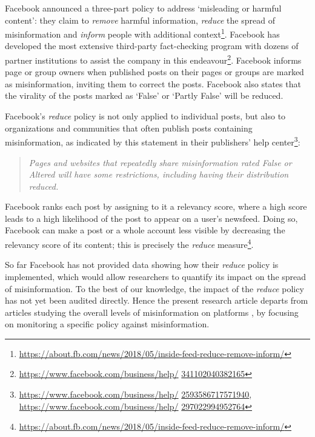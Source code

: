 \documentclass[11pt,a4paper]{article}
\begin{document}
Facebook announced a three-part policy to address ‘misleading or harmful content’: they claim to \textit{remove} harmful information, \textit{reduce} the spread of misinformation and \textit{inform} people with additional context\footnote{\href{https://about.fb.com/news/2018/05/inside-feed-reduce-remove-inform/}{https://about.fb.com/news/2018/05/inside-feed-reduce-remove-inform/}}. 
Facebook has developed the most extensive third-party fact-checking program with dozens of partner institutions to assist the company in this endeavour\footnote{\href{https://www.facebook.com/business/help/341102040382165}{https://www.facebook.com/business/help/} \href{https://www.facebook.com/business/help/341102040382165}{341102040382165}}.
Facebook informs page or group owners when published posts on their pages or groups are marked as misinformation, inviting them to correct the posts.
Facebook also states that the virality of the posts marked as `False' or `Partly False' will be reduced.

Facebook’s \textit{reduce} policy is not only applied to individual posts, but also to organizations and communities that often publish posts containing misinformation, as indicated by this statement in their publishers’ help center\footnote{\href{https://www.facebook.com/business/help/2593586717571940}{https://www.facebook.com/business/help/} \href{https://www.facebook.com/business/help/2593586717571940}{2593586717571940}, \href{https://www.facebook.com/business/help/297022994952764}{https://www.facebook.com/business/help/} \href{https://www.facebook.com/business/help/297022994952764}{297022994952764}}: 
\begin{quote}
\emph{Pages and websites that repeatedly share misinformation rated False or Altered will have some restrictions, including having their distribution reduced.}
\end{quote}
Facebook ranks each post by assigning to it a relevancy score, where a high score leads to a high likelihood of the post to appear on a user's newsfeed. 
Doing so, Facebook can make a post or a whole account less visible by decreasing the relevancy score of its content; this is precisely the {\it reduce} measure\footnote{\href{https://about.fb.com/news/2018/05/inside-feed-reduce-remove-inform/}{https://about.fb.com/news/2018/05/inside-feed-reduce-remove-inform/}}.

So far Facebook has not provided data showing how their {\it reduce} policy is implemented, which would allow researchers to quantify its impact on the spread of misinformation. 
To the best of our knowledge, the impact of the {\it reduce} policy has not yet been audited directly.
Hence the present research article departs from articles studying the overall levels of misinformation on platforms \citep{allcott2019trends, kornbluh2020new, resnick2018iffy}, by focusing on monitoring a specific policy against misinformation.
\end{document}

